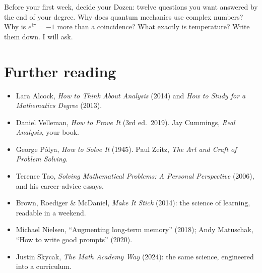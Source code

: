 \documentclass{kaelearn}
\begin{document}
\begin{guessfirst}
Before your first week, decide your Dozen: twelve questions you want answered by the end of your degree. Why
does quantum mechanics use complex numbers? Why is $e^{i\pi}=-1$ more than a coincidence? What exactly is
temperature? Write them down. I will ask.
\end{guessfirst}

\section{Further reading}
\begin{itemize}
  \item Lara Alcock, \emph{How to Think About Analysis} (2014) and \emph{How to Study for a Mathematics Degree} (2013).
  \item Daniel Velleman, \emph{How to Prove It} (3rd ed.\ 2019). Jay Cummings, \emph{Real Analysis}, your book.
  \item George Pólya, \emph{How to Solve It} (1945). Paul Zeitz, \emph{The Art and Craft of Problem Solving}.
  \item Terence Tao, \emph{Solving Mathematical Problems: A Personal Perspective} (2006), and his career-advice essays.
  \item Brown, Roediger \& McDaniel, \emph{Make It Stick} (2014): the science of learning, readable in a weekend.
  \item Michael Nielsen, ``Augmenting long-term memory'' (2018); Andy Matuschak, ``How to write good prompts'' (2020).
  \item Justin Skycak, \emph{The Math Academy Way} (2024): the same science, engineered into a curriculum.
\end{itemize}

\end{document}
